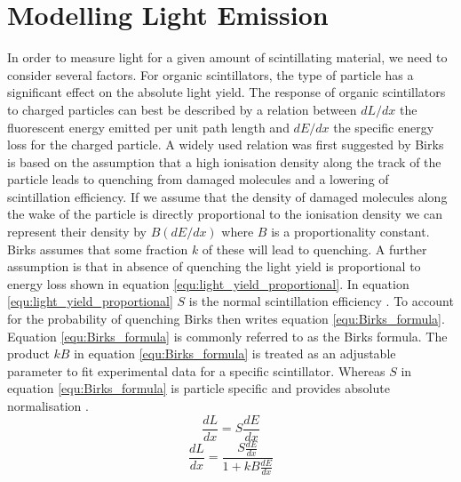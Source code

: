 \section{Modelling Light Emission}\label{sec:GEANT4Simulation_ModellingLightEmission}
In order to measure light for a given amount of scintillating material, we need to consider several factors. For organic scintillators, the type of particle has a significant effect on the absolute light yield. The response of organic scintillators to charged particles can best be described by a relation between $dL/dx$ the fluorescent energy emitted per unit path length and $dE/dx$ the specific energy loss for the charged particle.  A widely used relation was first suggested by Birks \cite{birks_1964} is based on the assumption that a high ionisation density along the track of the particle leads to quenching from damaged molecules and a lowering of  scintillation efficiency. If we assume that the density of damaged molecules along the wake of the particle is directly proportional to the ionisation density we can represent their density by $B(dE/dx)$ where $B$ is a proportionality constant. Birks assumes that some fraction $k$ of these will lead to quenching\cite{knoll_2010}. A further assumption is that in absence of quenching the light yield is proportional to energy loss shown in equation \ref{equ:light_yield_proportional}. In equation \ref{equ:light_yield_proportional} $S$ is the normal scintillation efficiency \cite{birks_1964}. To account for the probability of quenching Birks then writes equation \ref{equ:Birks_formula}. Equation \ref{equ:Birks_formula} is commonly referred to as the Birks formula. The product $kB$ in equation \ref{equ:Birks_formula} is treated as an adjustable parameter to fit experimental data for a specific scintillator. Whereas $S$ in equation \ref{equ:Birks_formula} is particle specific and provides absolute normalisation \cite{knoll_2010}.  
\begin{equation}
\frac{dL}{dx} = S\frac{dE}{dx}
\label{equ:light_yield_proportional}
\end{equation}
\begin{equation}
\frac{dL}{dx} = \frac{S\frac{dE}{dx}}{1 + kB \frac{dE}{dx}}
\label{equ:Birks_formula}
\end{equation}
